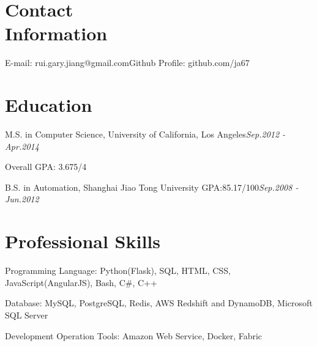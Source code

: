 \documentclass[margin,line]{resume}
\begin{document}
\begin{resume}
\section{\mystyle Contact\\Information}
E-mail: rui.gary.jiang@gmail.com\hfill Github Profile: github.com/ja67

\section{\mystyle Education}%
\begin{list2}
\item M.S. in Computer Science, University of California, Los Angeles\hfill \textsl{Sep.2012 - Apr.2014}
\item  Overall GPA: 3.675/4 \hfill
\item B.S. in Automation, Shanghai Jiao Tong University GPA:85.17/100\hfill \textsl{Sep.2008 - Jun.2012}
\end{list2}
\section{\mystyle Professional Skills}
\begin{list2}
\item Programming Language: Python(Flask), SQL, HTML, CSS, JavaScript(AngularJS), Bash, C\#, C++
\item Database: MySQL, PostgreSQL, Redis, AWS Redshift and DynamoDB, Microsoft SQL Server
\item Development Operation Tools: Amazon Web Service, Docker, Fabric
\end{list2}

\end{resume}
\end{document}
